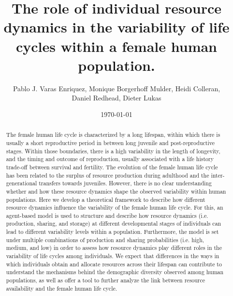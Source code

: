 \documentclass{article}
\title{The role of individual resource dynamics in the variability of life cycles within a female human population.}
\author{Pablo J. Varas Enriquez, Monique Borgerhoff Mulder, Heidi Colleran,
\\
Daniel Redhead, Dieter Lukas}
\date{\today}
\begin{document}
\maketitle

\begin{abstract}
    The female human life cycle is characterized by a long lifespan, within which there is usually a short reproductive period in between long juvenile and post-reproductive stages. Within those boundaries, there is a high variability in the length of longevity, and the timing and outcome of reproduction, usually associated with a life history trade-off between survival and fertility. The evolution of the female human life cycle has been related to the surplus of resource production during adulthood and the inter-generational transfers towards juveniles. However, there is no clear understanding whether and how these resource dynamics shape the observed variability within human populations. Here we develop a theoretical framework to describe how different resource dynamics influence the variability of the female human life cycle. For this, an agent-based model is used to structure and describe how resource dynamics (i.e. production, sharing, and storage) at different developmental stages of individuals can lead to different variability levels within a population. Furthermore, the model is set under multiple combinations of production and sharing probabilities (i.e. high, medium, and low) in order to assess how resource dynamics play different roles in the variability of life cycles among individuals. We expect that differences in the ways in which individuals obtain and allocate resources across their lifespan can contribute to understand the mechanisms behind the demographic diversity observed among human populations, as well as offer a tool to further analyze the link between resource availability and the female human life cycle. 
\end{abstract}
\end{document}
